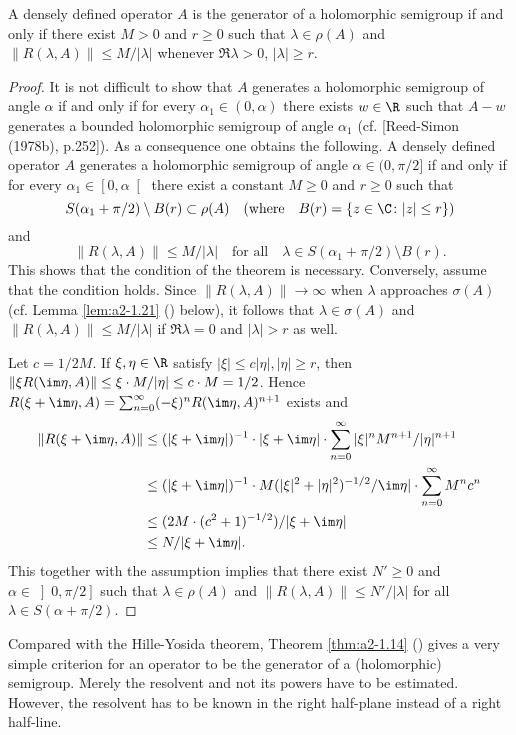 \begin{theorem}\label{thm:a2-1.14}
A densely defined operator $A$ is the generator of a holomorphic semigroup if and only if there exist $M > 0$ and $r \geq 0$ such that $\lambda \in \rho(A)$ and $\|R(\lambda,A)\| \leq M/|\lambda|$ whenever $\Re\lambda > 0$, $|\lambda| \geq r$.
\end{theorem}
\begin{proof}
It is not difficult to show that $A$ generates a holomorphic semigroup of angle $\alpha$ if and only if for every $\alpha_{1} \in (0,\alpha)$ there exists 
$w \in \R$ such that $A - w$ generates a bounded holomorphic semigroup of angle 
$\alpha_{1}$ (cf. [Reed-Simon (1978b), p.252]).
As a consequence one obtains the following.
A densely defined operator $A$ generates a holomorphic semigroup of angle $\alpha \in (0,\pi/2]$ if and only if for every $\alpha_{1} \in \left[0,\alpha\right[$ there exist a constant $M \geq 0$ and $r \geq 0$ such that 
\[
S(\alpha_{1} + \pi/2) \setminus B(r) \subset \rho(A) \quad (\text{where} \quad B(r) = \{z \in \C \colon |z| \leq r\})
\]
and
\[
\|R(\lambda,A)\| \leq M/|\lambda|  \quad \text{for all}  \quad \lambda \in S(\alpha_{1}+\pi/2) \setminus B(r).
\]
This shows that the condition of the theorem is necessary.
Conversely, assume that the condition holds.
Since $\|R(\lambda,A)\| \to \infty$ when $\lambda$ approaches $\sigma(A)$ (cf. Lemma  \ref{lem:a2-1.21} () below), 
it follows that $\lambda \in \sigma(A)$ and $\|R(\lambda,A)\| \leq M/|\lambda|$ if $\Re\lambda = 0$ and $|\lambda| > r$ as well.

Let $c = 1/2M$.
If $\xi, \eta \in \R$ satisfy 
$|\xi| \leq c|\eta|, |\eta| \geq r$, 
then $\|\xi R(\im\eta,A)\| \leq \xi \cdot M/|\eta| \leq c \cdot M = 1/2$.
Hence $R(\xi+\im\eta,A) = \sum_{n=0}^\infty (-\xi)^{n}R(\im\eta,A)^{n+1}$ exists and 
\begin{align*}
    \|R(\xi+\im\eta,A)\| &\leq 
    (|\xi + \im\eta|)^{-1} \cdot |\xi + \im\eta| \cdot \sum_{n=0}^\infty |\xi|^{n}M^{n+1}/|\eta|^{n+1}\\
    &\leq  (|\xi + \im\eta|)^{-1} \cdot M (|\xi|^{2} + |\eta|^{2})^{-1/2} / \im\eta| \cdot \sum_{n=0}^\infty M^{n}c^{n}\\   
    &\leq  (2M\cdot(c^{2}+1)^{-1/2})/|\xi+\im\eta| \\
    &\leq N/|\xi+\im\eta| .
\end{align*}
This together with the assumption implies that there exist $N' \geq 0$ and $\alpha \in \left]0,\pi/2\right]$ such that $\lambda \in \rho(A)$ and $\|R(\lambda,A)\| \leq N'/|\lambda|$ for all $\lambda \in S(\alpha+\pi/2)$.
\end{proof}
Compared with the Hille-Yosida theorem, Theorem \ref{thm:a2-1.14} () gives a very simple criterion for an operator to be the generator of a (holomorphic) semigroup.
Merely the resolvent and not its powers have to be
estimated.
However, the resolvent has to be known in the right half-plane instead of a right half-line.

